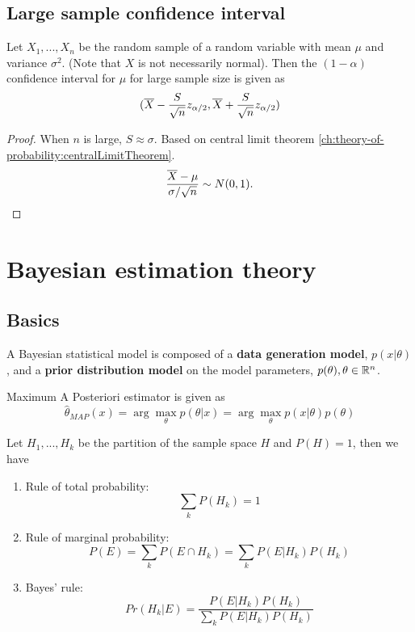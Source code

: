 \begin{refsection}
\subsection{Large sample confidence interval}
\begin{lemma}\cite[220]{hoggintroduction}
Let $X_1,...,X_n$ be the random sample of a random variable with mean $\mu$ and variance $\sigma^2$. (Note that $X$ is not necessarily normal). Then the $(1-\alpha)$ confidence interval for $\mu$ for large sample size is given as
	$$(\overline{X} - \frac{S}{\sqrt{n}}z_{\alpha/2},\overline{X} + \frac{S}{\sqrt{n}}z_{\alpha/2})$$
\end{lemma}
\begin{proof}
When $n$ is large, $S \approx \sigma$. Based on central limit theorem \autoref{ch:theory-of-probability:centralLimitTheorem}.
$$\frac{\overline{X} - \mu}{\sigma/\sqrt{n}} \sim N(0,1).$$
\end{proof}




\section{Bayesian estimation theory}
\subsection{Basics}
\begin{definition}
	A Bayesian statistical model is composed of a \textbf{data generation model}, $p(x|\theta)$, and a \textbf{prior distribution model} on the model parameters, $p(\theta),\theta\in \mathbb{R}^n$. 
\end{definition}


\begin{definition}
	Maximum A Posteriori estimator is given as
	$$\hat{\theta}_{MAP}(x) = \arg\max_{\theta} p(\theta|x) = \arg\max_{\theta} p(x|\theta)p(\theta)$$
\end{definition}


\begin{lemma}\cite[15]{hoff2009first}\hfill
	Let $H_1,...,H_k$ be the partition of the sample space $H$ and $P(H) = 1$, then we have
	\begin{enumerate}
		\item Rule of total probability:
		$$\sum_k P(H_k) = 1$$
		\item Rule of marginal probability:
		$$P(E) = \sum_k P(E\cap H_k) = \sum_k P(E|H_k)P(H_k)$$
		\item Bayes' rule:
		$$Pr(H_k|E) = \frac{P(E|H_k)P(H_k)}{\sum_k P(E|H_k)P(H_k)}$$    
	\end{enumerate}
	

\end{lemma}
\end{refsection}

